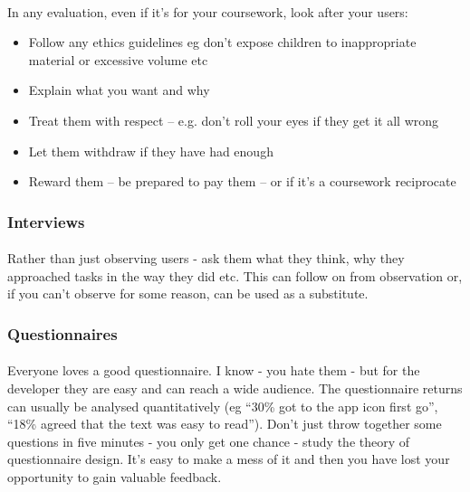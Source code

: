\documentclass[12pt, a4paper, twoside]{book}
\begin{document}
\paragraph{} In any evaluation, even if it’s for your coursework, look after your users:
\begin{itemize}
\item Follow any ethics guidelines eg don’t expose children to inappropriate material or excessive volume etc
\item Explain what you want and why
\item Treat them with respect – e.g. don’t roll your eyes if they get it all wrong
\item Let them withdraw if they have had enough
\item Reward them – be prepared to pay them – or if it’s a coursework reciprocate
\end{itemize}

\subsubsection{Interviews}

\paragraph{} Rather than just observing users - ask them what they think, why they approached tasks in the way they did etc. This can follow on from observation or, if you can’t observe for some reason, can be used as a substitute.

\subsubsection{Questionnaires}
\paragraph{} Everyone loves a good questionnaire. I know - you hate them - but for the developer they are easy and can reach a wide audience. The questionnaire returns can usually be analysed quantitatively (eg ``30\% got to the app icon first go'', ``18\% agreed that the text was easy to read''). Don’t just throw together some questions in five minutes - you only get one chance - study the theory of questionnaire design. It’s easy to make a mess of it and then you have lost your opportunity to gain valuable feedback.
\end{document}
